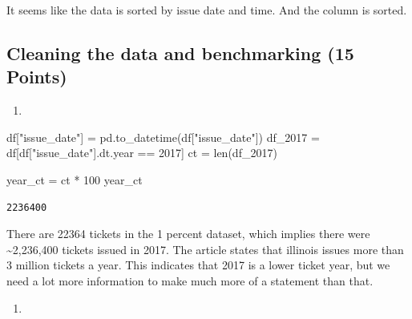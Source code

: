 \documentclass[
  letterpaper,
  DIV=11,
  numbers=noendperiod]{scrartcl}
\newenvironment{Shaded}{\begin{snugshade}}{\end{snugshade}}
\newcommand{\BuiltInTok}[1]{\textcolor[rgb]{0.00,0.23,0.31}{#1}}
\newcommand{\DecValTok}[1]{\textcolor[rgb]{0.68,0.00,0.00}{#1}}
\newcommand{\NormalTok}[1]{\textcolor[rgb]{0.00,0.23,0.31}{#1}}
\newcommand{\OperatorTok}[1]{\textcolor[rgb]{0.37,0.37,0.37}{#1}}
\newcommand{\StringTok}[1]{\textcolor[rgb]{0.13,0.47,0.30}{#1}}
\providecommand{\tightlist}{%
  \setlength{\itemsep}{0pt}\setlength{\parskip}{0pt}}\usepackage{longtable,booktabs,array}
\begin{document}
It seems like the data is sorted by issue date and time. And the column
is sorted.

\subsection{Cleaning the data and benchmarking (15
Points)}\label{cleaning-the-data-and-benchmarking-15-points}

\begin{enumerate}
\def\labelenumi{\arabic{enumi}.}
\tightlist
\item
\end{enumerate}

\begin{Shaded}
\begin{Highlighting}[]
\NormalTok{df[}\StringTok{"issue\_date"}\NormalTok{] }\OperatorTok{=}\NormalTok{ pd.to\_datetime(df[}\StringTok{"issue\_date"}\NormalTok{])}
\NormalTok{df\_2017 }\OperatorTok{=}\NormalTok{ df[df[}\StringTok{"issue\_date"}\NormalTok{].dt.year }\OperatorTok{==} \DecValTok{2017}\NormalTok{]}
\NormalTok{ct }\OperatorTok{=} \BuiltInTok{len}\NormalTok{(df\_2017)}

\NormalTok{year\_ct }\OperatorTok{=}\NormalTok{ ct }\OperatorTok{*} \DecValTok{100}
\NormalTok{year\_ct}
\end{Highlighting}
\end{Shaded}

\begin{verbatim}
2236400
\end{verbatim}

There are 22364 tickets in the 1 percent dataset, which implies there
were \textasciitilde2,236,400 tickets issued in 2017. The article states
that illinois issues more than 3 million tickets a year. This indicates
that 2017 is a lower ticket year, but we need a lot more information to
make much more of a statement than that.

\begin{enumerate}
\def\labelenumi{\arabic{enumi}.}
\tightlist
\item
\end{enumerate}
\end{document}
